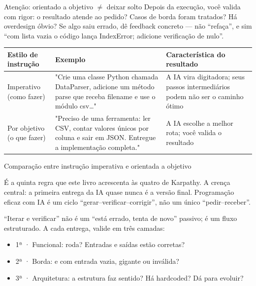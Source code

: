 \begin{tcbwarn}{Atenção: orientado a objetivo $\neq$ deixar solto}
Depois da execução, você valida com rigor: o resultado atende ao pedido? Casos de borda foram tratados? Há overdesign óbvio? Se algo saiu errado, dê feedback concreto — não “refaça”, e sim “com lista vazia o código lança IndexError; adicione verificação de nulo”.

\end{tcbwarn}

\begin{center}
\begin{tabularx}{\linewidth}{|X|X|X|}
\hline
\textbf{Estilo de instrução} & \textbf{Exemplo} & \textbf{Característica do resultado} \tabularnewline
\hline
Imperativo (como fazer) & "Crie uma classe Python chamada DataParser, adicione um método parse que receba filename e use o módulo csv…" & A IA vira digitadora; seus passos intermediários podem não ser o caminho ótimo \tabularnewline
Por objetivo (o que fazer) & "Preciso de uma ferramenta: ler CSV, contar valores únicos por coluna e sair em JSON. Entregue a implementação completa." & A IA escolhe a melhor rota; você valida o resultado \tabularnewline
\hline
\end{tabularx}
\end{center}

\begin{center}\small\color{gray}Comparação entre instrução imperativa e orientada a objetivo\end{center}


É a quinta regra que este livro acrescenta às quatro de Karpathy. A crença central: a primeira entrega da IA quase nunca é a versão final. Programação eficaz com IA é um ciclo “gerar–verificar–corrigir”, não um único “pedir–receber”.

“Iterar e verificar” não é um “está errado, tenta de novo” passivo; é um fluxo estruturado. A cada entrega, valide em três camadas:

\begin{itemize}
  \item 1ª · Funcional: roda? Entradas e saídas estão corretas?
  \item 2ª · Borda: e com entrada vazia, gigante ou inválida?
  \item 3ª · Arquitetura: a estrutura faz sentido? Há hardcoded? Dá para evoluir?
\end{itemize}

